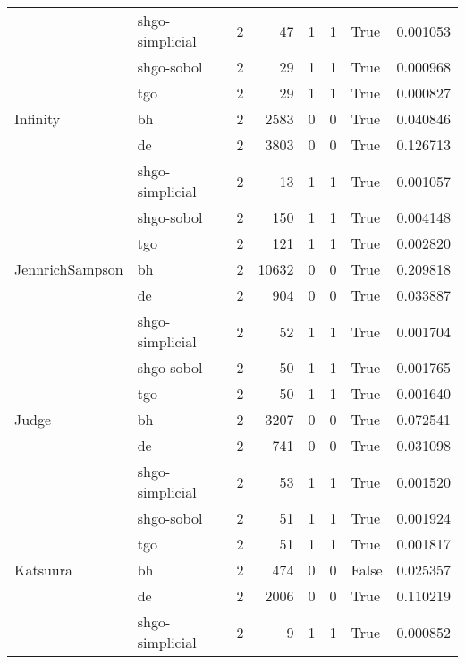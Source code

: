 \begin{longtable}{llrrrrlr}
         & shgo-simplicial &     2 &       47 &      1 &       1 &    True &    0.001053 \\
         & shgo-sobol &     2 &       29 &      1 &       1 &    True &    0.000968 \\
         & tgo &     2 &       29 &      1 &       1 &    True &    0.000827 \\
Infinity & bh &     2 &     2583 &      0 &       0 &    True &    0.040846 \\
         & de &     2 &     3803 &      0 &       0 &    True &    0.126713 \\
         & shgo-simplicial &     2 &       13 &      1 &       1 &    True &    0.001057 \\
         & shgo-sobol &     2 &      150 &      1 &       1 &    True &    0.004148 \\
         & tgo &     2 &      121 &      1 &       1 &    True &    0.002820 \\
JennrichSampson & bh &     2 &    10632 &      0 &       0 &    True &    0.209818 \\
         & de &     2 &      904 &      0 &       0 &    True &    0.033887 \\
         & shgo-simplicial &     2 &       52 &      1 &       1 &    True &    0.001704 \\
         & shgo-sobol &     2 &       50 &      1 &       1 &    True &    0.001765 \\
         & tgo &     2 &       50 &      1 &       1 &    True &    0.001640 \\
Judge & bh &     2 &     3207 &      0 &       0 &    True &    0.072541 \\
         & de &     2 &      741 &      0 &       0 &    True &    0.031098 \\
         & shgo-simplicial &     2 &       53 &      1 &       1 &    True &    0.001520 \\
         & shgo-sobol &     2 &       51 &      1 &       1 &    True &    0.001924 \\
         & tgo &     2 &       51 &      1 &       1 &    True &    0.001817 \\
Katsuura & bh &     2 &      474 &      0 &       0 &   False &    0.025357 \\
         & de &     2 &     2006 &      0 &       0 &    True &    0.110219 \\
         & shgo-simplicial &     2 &        9 &      1 &       1 &    True &    0.000852 \\

\end{longtable}
